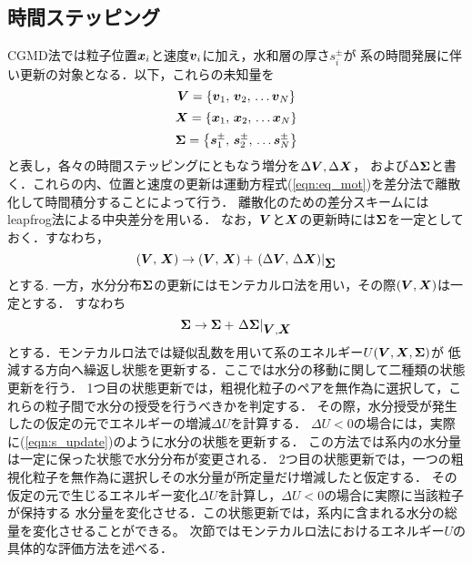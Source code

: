 \subsection{時間ステッピング}
CGMD法では粒子位置$\mbox{\boldmath $x$}_i$と速度$\mbox{\boldmath $v$}_i$に加え，水和層の厚さ$s_i^\pm$が
系の時間発展に伴い更新の対象となる．以下，これらの未知量を
\begin{equation}
	\mbox{\boldmath $V$}=\left\{ \mbox{\boldmath $v$}_1,\, \mbox{\boldmath $v$}_2,\, \dots \mbox{\boldmath $v$}_N \right\}
	\label{eqn:defV}
\end{equation}
\begin{equation}
	\mbox{\boldmath $X$}=\left\{ \mbox{\boldmath $x$}_1,\, \mbox{\boldmath $x$}_2,\, \dots \mbox{\boldmath $x$}_N \right\}
	\label{eqn:defV}
\end{equation}
\begin{equation}
	\mbox{\boldmath $\Sigma$}=\left\{ \mbox{\boldmath $s$}_1^\pm,\, \mbox{\boldmath $s$}_2^\pm,\, \dots \mbox{\boldmath $s$}_N^\pm \right\}
	\label{eqn:defV}
\end{equation}
と表し，各々の時間ステッピングにともなう増分を$\Delta \mbox{\boldmath $V$},\Delta \mbox{\boldmath $X$}$，
および$\Delta \mbox{\boldmath $\Sigma$}$と書く．これらの内、位置と速度の更新は運動方程式(\ref{eqn:eq_mot})を差分法で離散化して時間積分することによって行う．
離散化のための差分スキームにはleapfrog法による中央差分を用いる．
なお，$\mbox{\boldmath $V$}$と$\mbox{\boldmath $X$}$の更新時には$\mbox{\boldmath $\Sigma$}$を一定としておく．すなわち，
\begin{equation}
	\left( \mbox{\boldmath $V$},\,\mbox{\boldmath $X$} \right)
	\rightarrow 
	\left( \mbox{\boldmath $V$},\,\mbox{\boldmath $X$} \right)
	+
	\left. \left( \Delta \mbox{\boldmath $V$},\, \Delta \mbox{\boldmath $X$} \right) \right|_{\mbox{\boldmath $\Sigma$}}
	\label{eqn:vx_update}
\end{equation}
とする. 一方，水分分布$\mbox{\boldmath $\Sigma$}$の更新にはモンテカルロ法を用い，その際$(\mbox{\boldmath $V$},\mbox{\boldmath $X$})$は一定とする．
すなわち
\begin{equation}
	\mbox{\boldmath $\Sigma$} \rightarrow \mbox{\boldmath $\Sigma$} + \left. \Delta \mbox{\boldmath $\Sigma$} \right|_{\mbox{\boldmath $V$},\mbox{\boldmath $X$}}
	\label{eqn:s_update}
\end{equation}
とする．モンテカルロ法では疑似乱数を用いて系のエネルギー$U(\mbox{\boldmath $V$},\mbox{\boldmath $X$},\mbox{\boldmath $\Sigma$})$が
低減する方向へ繰返し状態を更新する．ここでは水分の移動に関して二種類の状態更新を行う．
1つ目の状態更新では，粗視化粒子のペアを無作為に選択して，これらの粒子間で水分の授受を行うべきかを判定する．
その際，水分授受が発生したの仮定の元でエネルギーの増減$\Delta U$を計算する．
$\Delta U<0$の場合には，実際に(\ref{eqn:s_update})のように水分の状態を更新する．
この方法では系内の水分量は一定に保った状態で水分分布が変更される．
2つ目の状態更新では，一つの粗視化粒子を無作為に選択しその水分量が所定量だけ増減したと仮定する．
その仮定の元で生じるエネルギー変化$\Delta U$を計算し，$\Delta U<0$の場合に実際に当該粒子が保持する
水分量を変化させる．この状態更新では，系内に含まれる水分の総量を変化させることができる。
次節ではモンテカルロ法におけるエネルギー$U$の具体的な評価方法を述べる．
